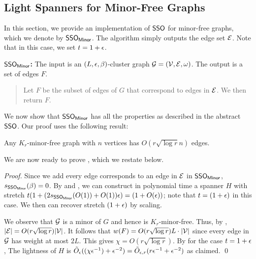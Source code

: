 \subsection{Light Spanners for Minor-Free Graphs}\label{subsec:minor-light}


In this section, we provide an implementation of \hyperlink{SPHigh}{$\mathsf{SSO}$} for minor-free graphs, which we denote by $\mathsf{SSO}_{\mathsf{Minor}}$. The algorithm simply outputs the edge set $\mathcal{E}$. Note that in this case, we set $t = 1+\epsilon$.


\begin{tcolorbox}
	\hypertarget{SPHMinor}{}
	\textbf{$\mathsf{SSO}_{\mathsf{Minor}}$:} The input is an $(L,\epsilon,\beta)$-cluster graph $\mathcal{G}=(\mathcal{V},\mathcal{E},\omega)$. The output is a set of edges $F$. 
	\begin{quote}
		 Let $F$ be the subset of edges of $G$ that correspond to edges in $\mathcal{E}$. We then return $F$.
	\end{quote}
\end{tcolorbox}


We now show that $\mathsf{SSO}_{\mathsf{Minor}}$ has all the properties as described in the abstract  \hyperlink{SPHigh}{$\mathsf{SSO}$}. Our proof uses the following result:

\begin{lemma}\label{lm:minor-sparsity} Any $K_r$-minor-free graph with $n$ vertices has $O(r\sqrt{\log r}n)$ edges. 
\end{lemma}

We are now ready to prove , which we restate below. 
\MinorFree*
\begin{proof}  
	Since we add every edge corresponds to an edge in $\mathcal{E}$ in \hyperlink{SPHMinor}{$\mathsf{SSO}_{\mathsf{Minor}}$}, $s_{\mathsf{SSO}_{\mathsf{Minor}}}(\beta) = 0$.
		By  and , we can construct in polynomial time a spanner $H$ with stretch $t(1 + (2s_{\mathsf{SSO}_{\mathsf{Minor}}}(O(1)) +  O(1))\epsilon) = (1 + O(\epsilon))$; note that $t = (1+\epsilon)$ in this case. We then can recover stretch $(1+\epsilon)$ by scaling. 
	
	We observe that $\mathcal{G}$ is a minor of $G$ and hence is $K_r$-minor-free. Thus, by , $|\mathcal{E}| = O(r\sqrt{\log r})|\mathcal{V}|$. It follows that $w(F) = O(r\sqrt{\log r})L\cdot |\mathcal{V}|$ since every edge in $\mathcal{G}$ has weight at most $2L$. This gives $\chi = O(r\sqrt{\log r})$. By  for the case $t = 1+\epsilon$,
	The lightness of $H$ is  $\tilde{O}_{\epsilon}((\chi \epsilon^{-1}) + \epsilon^{-2}) = \tilde{O}_{\epsilon,r}(r\epsilon^{-1} + \epsilon^{-2})$  as claimed. \qed
	\end{proof}







